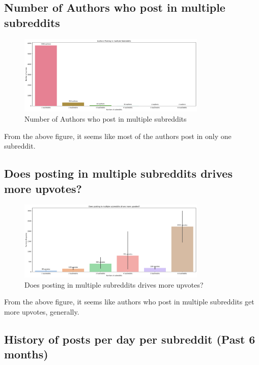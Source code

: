 \documentclass[12pt, letterpage]{article}
\begin{document}
\subsection*{Number of Authors who post in multiple subreddits}
\begin{figure}[H]
    \centering
    \includegraphics[width=0.8\textwidth]{num_authors_multiple_subreddit.png}
    \caption{Number of Authors who post in multiple subreddits}
    \label{fig:authors_per_subreddit}
\end{figure}

From the above figure, it seems like most of the authors post in only one subreddit.

\subsection*{Does posting in multiple subreddits drives more upvotes?}
\begin{figure}[H]
    \centering
    \includegraphics[width=0.8\textwidth]{post_multiple.png}
    \caption{Does posting in multiple subreddits drives more upvotes?}
    \label{fig:upvotes_per_subreddit}
\end{figure}

From the above figure, it seems like authors who post in multiple subreddits get more upvotes, generally.

\subsection*{History of posts per day per subreddit (Past 6 months)}
\end{document}
